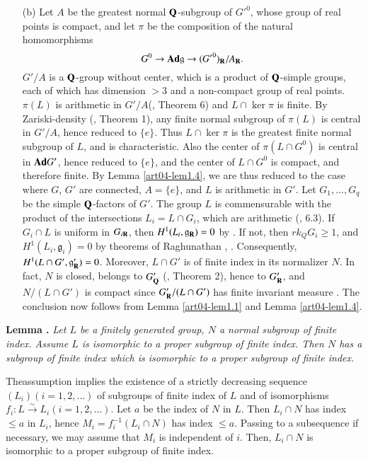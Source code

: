 \begin{itemize}
\item[(b)] Let $A$ be the greatest normal $\mathbf{Q}$-subgroup of ${G'}^{0}$, whose group of real points is compact, and let $\pi$ be the composition of the natural homomorphisms
$$
G^{0}\to \mathbf{Ad} \mathfrak{g}\to ({G'}^{0})_{\mathbf{R}}/A_{\mathbf{R}}.
$$
$G'/A$ is a $\mathbf{Q}$-group without center, which is a product of $\mathbf{Q}$-simple groups, each of which has dimension $>3$ and a non-compact group of real points. $\pi(L)$ is arithmetic in $G'/A$(\cite{art04-key6}, Theorem 6) and $L\cap \ker \pi$ is finite. By Zariski-density (\cite{art04-key6}, Theorem 1), any finite normal subgroup of $\pi(L)$ is central in $G'/A$, hence reduced to $\{e\}$. Thus $L\cap \ker \pi$ is the greatest finite normal subgroup of $L$, and is characteristic. Also the center of $\pi(L\cap G^{0})$ is central in $\mathbf{Ad} G'$, hence reduced to $\{e\}$, and the center of $L\cap G^{0}$ is compact, and therefore finite. By Lemma \ref{art04-lem1.4}, we are thus reduced to the case where $G$, $G'$ are connected, $A=\{e\}$, and $L$ is arithmetic in $G'$. Let $G_{1},\ldots,G_{q}$ be the simple $\mathbf{Q}$-factors of $G'$. The group $L$ is commensurable with the product of the intersections $L_{i}=L\cap G_{i}$, which are arithmetic (\cite{art04-key7}, 6.3). If $G_{i}\cap L$ is uniform in $G_{i\mathbf{R}}$, then $H^{1}(L_{i},\mathfrak{g}_{\mathbf{R}})=0$ by \cite{art04-key33}. If not, then $rk_{Q}G_{i}\geq 1$, and $H^{1}(L_{i},\mathfrak{g}_{i})=0$ by theorems of Raghunathan \cite{art04-key25}, \cite{art04-key26}. Consequently, $H^{1}(L\cap G',\mathfrak{g}'_{\mathbf{R}})=0$. Moreover, $L\cap G'$ is of finite index in its normalizer $N$. In fact, $N$ is closed, belongs to $G'_{\mathbf{Q}}$ (\cite{art04-key6}, Theorem 2), hence to $G'_{\mathbf{R}}$, and $N/(L\cap G')$ is compact since $G'_{\mathbf{R}}/(L\cap G')$ has finite invariant measure \cite{art04-key7}. The conclusion now follows from Lemma \ref{art04-lem1.1} and Lemma \ref{art04-lem1.4}.
\end{itemize}

\medskip
\noindent
{\bf Lemma .\label{art04-lem1.6}}
{\em Let $L$ be a finitely generated group, $N$ a normal subgroup of finite index. Assume $L$ is isomorphic to a proper subgroup of finite index. Then $N$ has a subgroup of finite index which is isomorphic to a proper subgroup of finite index.}
\smallskip

The\pageoriginale assumption implies the existence of a strictly decreasing sequence $(L_{i})(i=1,2,\ldots)$ of subgroups of finite index of $L$ and of isomorphisms $f_{i}:L\xrightarrow{\sim}L_{i}(i=1,2,\ldots)$. Let $a$ be the index of $N$ in $L$. Then $L_{i}\cap N$ has index $\leq a$ in $L_{i}$, hence $M_{i}=f^{-1}_{i}(L_{i}\cap N)$ has index $\leq a$. Passing to a subsequence if necessary, we may assume that $M_{i}$ is independent of $i$. Then, $L_{i}\cap N$ is isomorphic to a proper subgroup of finite index.

